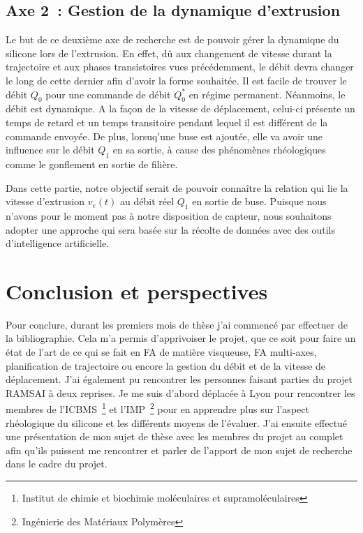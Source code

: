 \documentclass[11pt,a4paper]{article}
\begin{document}
    \subsection*{Axe 2~: Gestion de la dynamique d'extrusion}
        Le but de ce deuxième axe de recherche est de pouvoir gérer la dynamique du silicone lors de l'extrusion. En effet, dû aux changement de vitesse durant la trajectoire et aux phases transistoires vues précédemment, le débit devra changer le long de cette dernier afin d'avoir la forme souhaitée. Il est facile de trouver le débit $Q_0$ pour une commande de débit $Q_0^*$ en régime permanent. Néanmoins, le débit est dynamique. A la façon de la vitesse de déplacement, celui-ci présente un temps de retard et un temps transitoire pendant lequel il est différent de la commande envoyée.
        De plus, lorsuq'une buse est ajoutée, elle va avoir une influence sur le débit $Q_1$ en sa sortie, à cause des phénomènes rhéologiques comme le gonflement en sortie de filière. 

        Dans cette partie, notre objectif serait de pouvoir connaître la relation qui lie la vitesse d'extrusion $v_e(t)$ au débit réel $Q_1$ en sortie de buse. Puisque nous n'avons pour le moment pas à notre disposition de capteur, nous souhaitons adopter une approche qui sera basée sur la récolte de données avec des outils d'intelligence artificielle. 




\section{Conclusion et perspectives}
    Pour conclure, durant les premiers mois de thèse j'ai commencé par effectuer de la bibliographie. Cela m'a permis d'apprivoiser le projet, que ce soit pour faire un état de l'art de ce qui se fait en FA de matière visqueuse, FA multi-axes, planification de trajectoire ou encore la gestion du débit et de la vitesse de déplacement. J'ai également pu rencontrer les personnes faisant parties du projet RAMSAI à deux reprises. Je me suis d'abord déplacée à Lyon pour rencontrer les membres de l'ICBMS~\footnote{Institut de chimie et biochimie moléculaires et supramoléculaires} et l'IMP~\footnote{Ingénierie des Matériaux Polymères} pour en apprendre plus sur l'aspect rhéologique du silicone et les différents moyens de l'évaluer. J'ai ensuite effectué une présentation de mon sujet de thèse avec les membres du projet au complet afin qu'ils puissent me rencontrer et parler de l'apport de mon sujet de recherche dans le cadre du projet. 
\end{document}
